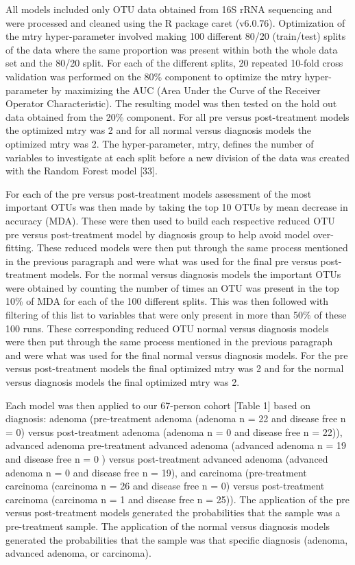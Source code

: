 \documentclass[12pt,]{article}
\begin{document}
All models included only OTU data obtained from 16S rRNA sequencing and
were processed and cleaned using the R package caret (v6.0.76).
Optimization of the mtry hyper-parameter involved making 100 different
80/20 (train/test) splits of the data where the same proportion was
present within both the whole data set and the 80/20 split. For each of
the different splits, 20 repeated 10-fold cross validation was performed
on the 80\% component to optimize the mtry hyper-parameter by maximizing
the AUC (Area Under the Curve of the Receiver Operator Characteristic).
The resulting model was then tested on the hold out data obtained from
the 20\% component. For all pre versus post-treatment models the
optimized mtry was 2 and for all normal versus diagnosis models the
optimized mtry was 2. The hyper-parameter, mtry, defines the number of
variables to investigate at each split before a new division of the data
was created with the Random Forest model {[}33{]}.

For each of the pre versus post-treatment models assessment of the most
important OTUs was then made by taking the top 10 OTUs by mean decrease
in accuracy (MDA). These were then used to build each respective reduced
OTU pre versus post-treatment model by diagnosis group to help avoid
model over-fitting. These reduced models were then put through the same
process mentioned in the previous paragraph and were what was used for
the final pre versus post-treatment models. For the normal versus
diagnosis models the important OTUs were obtained by counting the number
of times an OTU was present in the top 10\% of MDA for each of the 100
different splits. This was then followed with filtering of this list to
variables that were only present in more than 50\% of these 100 runs.
These corresponding reduced OTU normal versus diagnosis models were then
put through the same process mentioned in the previous paragraph and
were what was used for the final normal versus diagnosis models. For the
pre versus post-treatment models the final optimized mtry was 2 and for
the normal versus diagnosis models the final optimized mtry was 2.

Each model was then applied to our 67-person cohort {[}Table 1{]} based
on diagnosis: adenoma (pre-treatment adenoma (adenoma n = 22 and disease
free n = 0) versus post-treatment adenoma (adenoma n = 0 and disease
free n = 22)), advanced adenoma pre-treatment advanced adenoma (advanced
adenoma n = 19 and disease free n = 0 ) versus post-treatment advanced
adenoma (advanced adenoma n = 0 and disease free n = 19), and carcinoma
(pre-treatment carcinoma (carcinoma n = 26 and disease free n = 0)
versus post-treatment carcinoma (carcinoma n = 1 and disease free n =
25)). The application of the pre versus post-treatment models generated
the probabilities that the sample was a pre-treatment sample. The
application of the normal versus diagnosis models generated the
probabilities that the sample was that specific diagnosis (adenoma,
advanced adenoma, or carcinoma).
\end{document}
